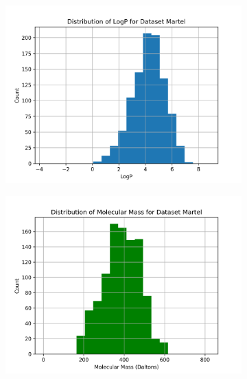 \documentclass{article}
\begin{document}
\begin{figure}
\bigskip %
\begin{subfigure}[t]{0.45\textwidth}
    \includegraphics[width=\linewidth]{./../plots/logp_distribution_Martel.png}
\end{subfigure}\hspace{\fill} %
\begin{subfigure}[t]{0.45\textwidth}
    \includegraphics[width=\linewidth]{./../plots/molecular_mass_distribution_Martel.png}
\end{subfigure}


\end{figure}
\end{document}
